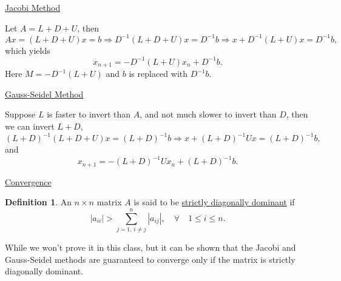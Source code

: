 \documentclass[reqno]{amsart}
\theoremstyle{definition}
\newtheorem{definition}{Definition}
\begin{document}
\bigskip

\underline{\color{blue}Jacobi Method}

Let $A = L+D+U$, then
%
\begin{equation*}
Ax = (L+D+U)x = b \Rightarrow D^{-1}(L+D+U)x = D^{-1}b \Rightarrow x + D^{-1}(L+U)x = D^{-1}b,
\end{equation*}
%
which yields
%
\begin{equation}
x_{n+1} = -D^{-1}(L+U)x_n + D^{-1}b.
\end{equation}
%
Here $M = -D^{-1}(L+U)$ and $b$ is replaced with $D^{-1}b$.

\bigskip

\underline{\color{blue}Gauss-Seidel Method}

Suppose $L$ is faster to invert than $A$, and not much slower to invert than $D$, then we can invert $L+D$,
%
\begin{equation*}
(L+D)^{-1}(L+D+U)x = (L+D)^{-1}b \Rightarrow x + (L+D)^{-1}Ux = (L+D)^{-1}b,
\end{equation*}
%
and
%
\begin{equation}
x_{n+1} = -(L+D)^{-1}Ux_n + (L+D)^{-1}b.
\end{equation}

\bigskip

\underline{\color{blue}Convergence}

\begin{definition}
\color{red} An $n\times n$ matrix $A$ is said to be \underline{strictly diagonally dominant} if
%
\begin{equation}
|a_{ii}| > \sum_{j=1,\, i\neq j}^n |a_{ij}|,\quad \forall\quad 1\leq i\leq n.
\end{equation}
\end{definition}
%

While we won't prove it in this class, but it can be shown that the Jacobi and Gauss-Seidel methods are guaranteed to converge only if the matrix is strictly diagonally dominant.
\end{document}
